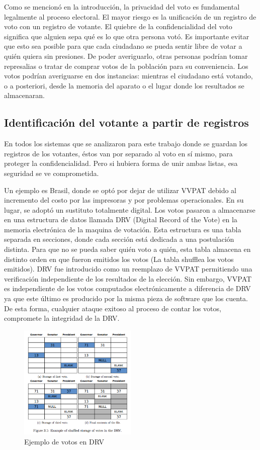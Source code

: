 Como se mencionó en la introducción, la privacidad del voto es fundamental legalmente al proceso electoral. El mayor riesgo es la unificación de un registro de voto con un registro de votante.
El quiebre de la confidencialidad del voto significa que alguien sepa qué es lo que otra persona votó. Es importante evitar que esto sea posible para que cada ciudadano se pueda sentir libre de votar a quién quiera sin presiones. De poder averiguarlo, otras personas podrían tomar represalias o tratar de comprar votos de la población para su conveniencia. Los votos podrían averiguarse en dos instancias: mientras el ciudadano está votando, o a posteriori, desde la memoria del aparato o el lugar donde los resultados se almacenaran.

\subsection{Identificación del votante a partir de registros}

En todos los sistemas que se analizaron para este trabajo donde se guardan los registros de los votantes, éstos van por separado al voto en sí mismo, para proteger la confidencialidad. Pero si hubiera forma de unir ambas listas, esa seguridad se ve comprometida.

Un ejemplo es Brasil, donde se optó por dejar de utilizar VVPAT debido al incremento del costo por las impresoras y por problemas operacionales. En su lugar, se adoptó un sustituto totalmente digital. Los votos pasaron a almacenarse en una estructura de datos llamada DRV (Digital Record of the Vote) en la memoria electrónica de la maquina de votación. Esta estructura es una tabla separada en secciones, donde cada sección está dedicada a una postulación distinta. Para que no se pueda saber quién voto a quién, esta tabla almacena en distinto orden en que fueron emitidos los votos (La tabla shufflea los votos emitidos)\cite{aranha}. DRV fue introducido como un reemplazo de VVPAT permitiendo una verificación independiente de los resultados de la elección. Sin embargo, VVPAT es independiente de los votos computados electrónicamente a diferencia de DRV ya que este último es producido por la misma pieza de software que los cuenta. De esta forma, cualquier ataque exitoso al proceso de contar los votos, compromete la integridad de la DRV.

\begin{figure}[H]
	\centering
	\includegraphics[width=0.5\textwidth]{Imagenes/privacidad1}
	\caption{Ejemplo de votos en DRV}
\end{figure}

